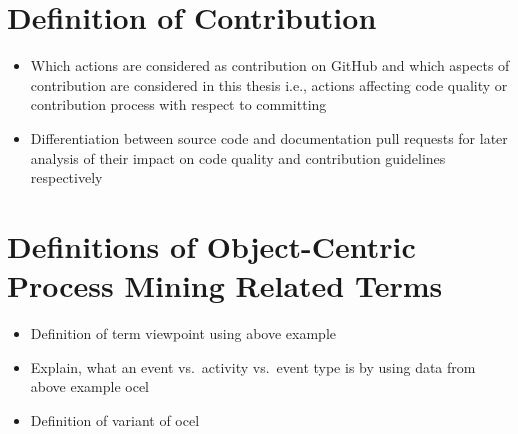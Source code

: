 \section{Definition of Contribution}
\begin{itemize}
	\item Which actions are considered as contribution on GitHub and which aspects of contribution are considered in this thesis i.e., actions affecting code quality or contribution process with respect to committing
	\item Differentiation between source code and documentation pull requests for later analysis of their impact on code quality and contribution guidelines respectively
\end{itemize}

\section{Definitions of Object-Centric Process Mining Related Terms}
\begin{itemize}
	\item Definition of term viewpoint using above example
	\item Explain, what an event vs.\ activity vs.\ event type is by using data from above example \ac{ocel} %
 	\item Definition of variant of \ac{ocel} %
\end{itemize}